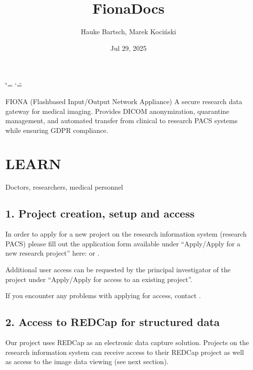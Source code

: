 \documentclass[letterpaper,10pt,english]{sphinxmanual}
\title{FionaDocs}
\date{Jul 29, 2025}
\author{Hauke Bartsch, Marek Kociński}
\begin{document}
\ifdefined\shorthandoff
  \ifnum\catcode`\=\string=\active\shorthandoff{=}\fi
  \ifnum\catcode`\"=\active{}\fi
\fi

\pagestyle{empty}
\sphinxmaketitle
\pagestyle{plain}
\sphinxtableofcontents
\pagestyle{normal}
\label{\detokenize{index::doc}}


\sphinxAtStartPar
FIONA (Flash\sphinxhyphen{}based Input/Output Network Appliance) \sphinxhyphen{} A secure research data gateway for medical imaging. Provides DICOM anonymization, quarantine management, and automated transfer from clinical to research PACS systems while ensuring GDPR compliance.

\sphinxstepscope


\chapter{LEARN}
\label{\detokenize{EndUser/index:learn}}\label{\detokenize{EndUser/index::doc}}
\sphinxAtStartPar
{} Doctors, researchers, medical personnel


\section{1. Project creation, setup and access}
\label{\detokenize{EndUser/index:project-creation-setup-and-access}}
\sphinxAtStartPar
In order to apply for a new project on the research information system (research PACS)
please fill out the application form available under “Apply/Apply for a new research project”
here:  or .

\sphinxAtStartPar
Additional user access can be requested by the principal investigator of the project under
“Apply/Apply for access to an existing project”.

\sphinxAtStartPar
If you encounter any problems with applying for access, contact .


\section{2. Access to REDCap for structured data}
\label{\detokenize{EndUser/index:access-to-redcap-for-structured-data}}
\sphinxAtStartPar
Our project uses REDCap as an electronic data capture solution. Projects on the research information system can receive access to their REDCap project as well as access to the image data viewing (see next section).
\end{document}
